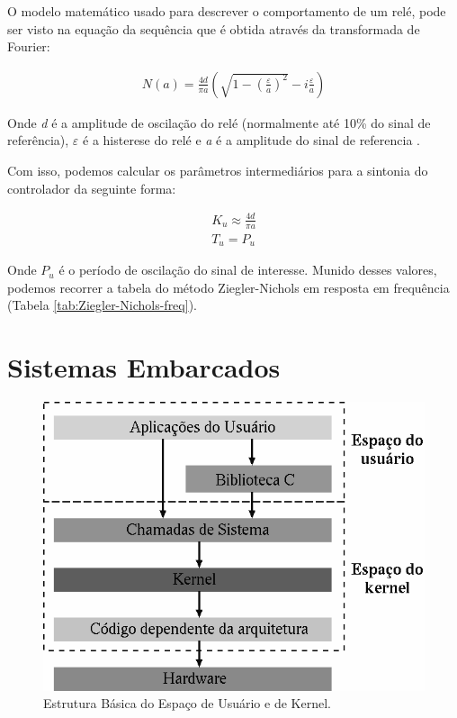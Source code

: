 O modelo matemático usado para descrever o comportamento de um relé, pode ser visto na equação da sequência que é obtida através da transformada de Fourier:

\begin{gather}
  N(a)=\frac{4d}{\pi a}\left(\sqrt{1-\left(\frac{\varepsilon}{a}\right)^{2}}-i\frac{\varepsilon}{a}\right) 
\end{gather}

Onde \textit{d} é a amplitude de oscilação do relé (normalmente até 10\% do sinal de referência), \textit{$\varepsilon$} é a histerese do relé e \textit{a} é a amplitude do sinal de referencia \cite{Levine1996}.

Com isso, podemos calcular os parâmetros intermediários para a sintonia do controlador da seguinte forma:

\begin{gather}
  K_u \approx \frac{4d}{\pi a} \\
  T_u = P_u
\end{gather}

Onde $P_u$ é o período de oscilação do sinal de interesse. Munido desses valores, podemos recorrer a tabela do método Ziegler-Nichols em resposta em frequência (Tabela \ref{tab:Ziegler-Nichols-freq}).



\section{Sistemas Embarcados}

\begin{figure}[!ht]
  \caption{Estrutura Básica do Espaço de Usuário e de Kernel.}
  \begin{center}
      \includegraphics[scale=0.75]{img/kernel_user_space}
  \end{center}
  \label{fig:kernel_user_space}
\end{figure}
  
